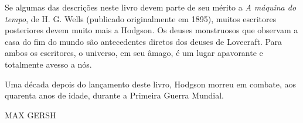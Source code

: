 Se algumas das descrições neste livro devem parte de seu mérito a \textit{A máquina do tempo}, de H. G. Wells (publicado
originalmente em 1895), muitos escritores posteriores devem muito mais a Hodgson. Os deuses monstruosos que observam a
casa do fim do mundo são antecedentes diretos dos deuses de Lovecraft. Para ambos os escritores, o universo, em seu
âmago, é um lugar apavorante e totalmente avesso a nós.

Uma década depois do lançamento deste livro, Hodgson morreu em combate, aos quarenta anos de idade, durante a Primeira Guerra
Mundial. 

MAX GERSH
